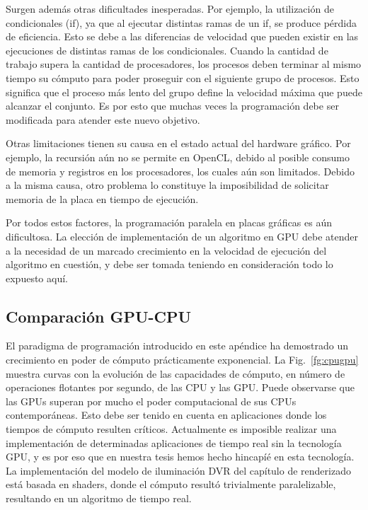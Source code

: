 Surgen además otras dificultades inesperadas.
Por ejemplo, la utilización de condicionales (if), ya que al ejecutar distintas ramas de un if, se produce pérdida de eficiencia.
Esto se debe a las diferencias de velocidad que pueden existir en las ejecuciones de distintas ramas de los condicionales.
Cuando la cantidad de trabajo supera la cantidad de procesadores, los procesos deben terminar al mismo tiempo su cómputo para poder proseguir con el siguiente grupo de procesos.
Esto significa que el proceso más lento del grupo define la velocidad máxima que puede alcanzar el conjunto.
Es por esto que muchas veces la programación debe ser modificada para atender este nuevo objetivo.

Otras limitaciones tienen su causa en el estado actual del hardware gráfico.
Por ejemplo, la recursión aún no se permite en OpenCL, debido al posible consumo de memoria y registros en los procesadores, los cuales aún son limitados.
Debido a la misma causa, otro problema lo constituye la imposibilidad de solicitar memoria de la placa en tiempo de ejecución.

Por todos estos factores, la programación paralela en placas gráficas es aún dificultosa.
La elección de implementación de un algoritmo en GPU debe atender a la necesidad de un marcado crecimiento en la velocidad de ejecución del algoritmo en cuestión, y debe ser tomada teniendo en consideración todo lo expuesto aquí.

\subsection{Comparación GPU-CPU}
El paradigma de programación introducido en este apéndice ha demostrado un crecimiento en poder de cómputo prácticamente exponencial.
La Fig.~\ref{fg:cpugpu} muestra curvas con la evolución de las capacidades de cómputo, en número de operaciones flotantes por segundo, de las CPU y las GPU.
Puede observarse que las GPUs superan por mucho el poder computacional de sus CPUs contemporáneas.
Esto debe ser tenido en cuenta en aplicaciones donde los tiempos de cómputo resulten críticos.
Actualmente es imposible realizar una implementación de determinadas aplicaciones de tiempo real sin la tecnología GPU, y es por eso que en nuestra tesis hemos hecho hincapíé en esta tecnología.
La implementación del modelo de iluminación DVR del capítulo de renderizado está basada en shaders, donde el cómputo resultó trivialmente paralelizable, resultando en un algoritmo de tiempo real.

